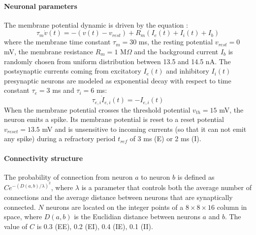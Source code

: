 \documentclass[11pt, a4paper]{article} %
\begin{document}
\paragraph{Neuronal parameters}
The membrane potential dynamic is driven by the equation :
\begin{equation}
\tau_m \dot{v}(t) = -(v(t)-v_{rest}) + R_m (I_e(t) + I_i(t) + I_b)
\label{IaF}
\end{equation}
where the membrane time constant $\tau_m = 30$ ms, the resting potential $v_{rest} = 0$ mV, the membrane resistance $R_m = 1$ M$\Omega$ and the background current $I_b$ is randomly chosen from uniform distribution between 13.5 and 14.5 nA. The postsynaptic currents coming from excitatory $I_e(t)$  and inhibitory $I_i(t)$ presynaptic neurons are modeled as exponential decay with respect to time constant $\tau_e = 3$ ms and $\tau_i = 6$ ms:
\begin{equation}
\tau_{e,i} \dot{I}_{e,i}(t) = -I_{e,i}(t)
\end{equation}
When the membrane potential crosses the threshold potential $v_{th} = 15$ mV, the neuron emits a spike. Its membrane potential is reset to a reset potential $v_{reset} = 13.5$ mV and is unsensitive to incoming currents (so that it can not emit any spike) during a refractory period $t_{ref}$ of 3 ms (E) or 2 ms (I).

\paragraph{Connectivity structure}
The probability of connection from neuron $a$ to neuron $b$ is defined as $C e^{-(D(a,b)/\lambda)^2}$, where $\lambda$ is a parameter that controls both the average number of connections and the average distance between neurons that are synaptically connected. $N$ neurons are located on the integer points of a $8 \times 8 \times 16$ column in space, where $D(a,b)$ is the Euclidian distance between neurons $a$ and $b$. The value of $C$ is 0.3 (EE), 0.2 (EI), 0.4 (IE), 0.1 (II).
\end{document}
